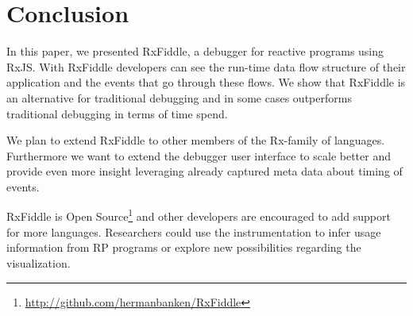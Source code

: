 \section{Conclusion}
In this paper, we presented RxFiddle, a debugger for reactive programs using RxJS. With RxFiddle developers can see the run-time data flow structure of their application and the events that go through these flows. We show that RxFiddle is an alternative for traditional debugging and in some cases outperforms traditional debugging in terms of time spend.

We plan to extend RxFiddle to other members of the Rx-family of languages. Furthermore we want to extend the debugger user interface to scale better and provide even more insight leveraging already captured meta data about timing of events.

RxFiddle is Open Source\footnote{\url{http://github.com/hermanbanken/RxFiddle}} and other developers are encouraged to add support for more languages. Researchers could use the instrumentation to infer usage information from RP programs or explore new possibilities regarding the visualization.